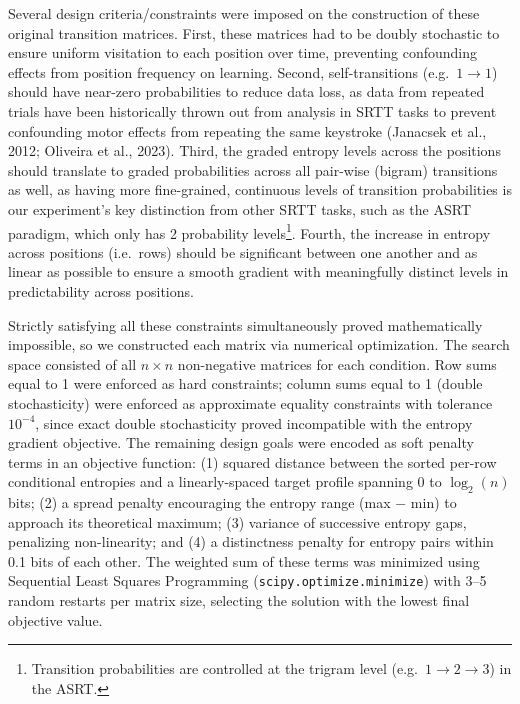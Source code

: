 \documentclass[
  10pt,
  letterpaper]{article}
\begin{document}
Several design criteria/constraints were imposed on the construction of
these original transition matrices. First, these matrices had to be
doubly stochastic to ensure uniform visitation to each position over
time, preventing confounding effects from position frequency on
learning. Second, self-transitions (e.g.~\(1 \rightarrow 1\)) should
have near-zero probabilities to reduce data loss, as data from repeated
trials have been historically thrown out from analysis in SRTT tasks to
prevent confounding motor effects from repeating the same keystroke
(Janacsek et al., 2012; Oliveira et al., 2023). Third, the graded
entropy levels across the positions should translate to graded
probabilities across all pair-wise (bigram) transitions as well, as
having more fine-grained, continuous levels of transition probabilities
is our experiment's key distinction from other SRTT tasks, such as the
ASRT paradigm, which only has 2 probability levels\footnote{Transition
  probabilities are controlled at the trigram level
  (e.g.~\(1 \rightarrow 2 \rightarrow 3\)) in the ASRT.}. Fourth, the
increase in entropy across positions (i.e.~rows) should be significant
between one another and as linear as possible to ensure a smooth
gradient with meaningfully distinct levels in predictability across
positions.

Strictly satisfying all these constraints simultaneously proved
mathematically impossible, so we constructed each matrix via numerical
optimization. The search space consisted of all \(n \times n\)
non-negative matrices for each condition. Row sums equal to 1 were
enforced as hard constraints; column sums equal to 1 (double
stochasticity) were enforced as approximate equality constraints with
tolerance \(10^{-4}\), since exact double stochasticity proved
incompatible with the entropy gradient objective. The remaining design
goals were encoded as soft penalty terms in an objective function: (1)
squared distance between the sorted per-row conditional entropies and a
linearly-spaced target profile spanning 0 to \(\log_2(n)\) bits; (2) a
spread penalty encouraging the entropy range (max \(-\) min) to approach
its theoretical maximum; (3) variance of successive entropy gaps,
penalizing non-linearity; and (4) a distinctness penalty for entropy
pairs within 0.1 bits of each other. The weighted sum of these terms was
minimized using Sequential Least Squares Programming
(\texttt{scipy.optimize.minimize}) with 3--5 random restarts per matrix
size, selecting the solution with the lowest final objective value.
\end{document}
